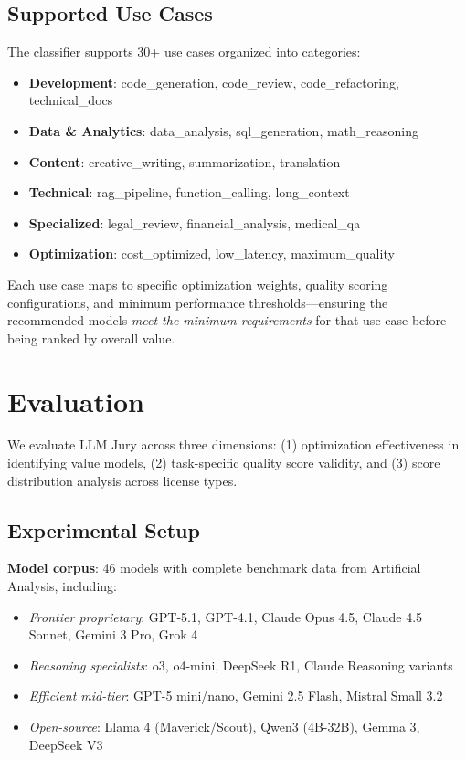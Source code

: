 \documentclass[11pt,a4paper]{article}
\begin{document}
\subsection{Supported Use Cases}

The classifier supports 30+ use cases organized into categories:

\begin{itemize}
    \item \textbf{Development}: code\_generation, code\_review, code\_refactoring, technical\_docs
    \item \textbf{Data \& Analytics}: data\_analysis, sql\_generation, math\_reasoning
    \item \textbf{Content}: creative\_writing, summarization, translation
    \item \textbf{Technical}: rag\_pipeline, function\_calling, long\_context
    \item \textbf{Specialized}: legal\_review, financial\_analysis, medical\_qa
    \item \textbf{Optimization}: cost\_optimized, low\_latency, maximum\_quality
\end{itemize}

Each use case maps to specific optimization weights, quality scoring configurations, and minimum performance thresholds---ensuring the recommended models \textit{meet the minimum requirements} for that use case before being ranked by overall value.


\section{Evaluation}
\label{sec:evaluation}

We evaluate LLM Jury across three dimensions: (1) optimization effectiveness in identifying value models, (2) task-specific quality score validity, and (3) score distribution analysis across license types.

\subsection{Experimental Setup}

\textbf{Model corpus}: 46 models with complete benchmark data from Artificial Analysis, including:
\begin{itemize}
    \item \textit{Frontier proprietary}: GPT-5.1, GPT-4.1, Claude Opus 4.5, Claude 4.5 Sonnet, Gemini 3 Pro, Grok 4
    \item \textit{Reasoning specialists}: o3, o4-mini, DeepSeek R1, Claude Reasoning variants
    \item \textit{Efficient mid-tier}: GPT-5 mini/nano, Gemini 2.5 Flash, Mistral Small 3.2
    \item \textit{Open-source}: Llama 4 (Maverick/Scout), Qwen3 (4B-32B), Gemma 3, DeepSeek V3
\end{itemize}
\end{document}
